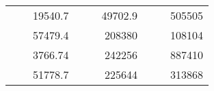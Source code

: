 \begin{table}[H]
\begin{tabular}{|ccrccrccc}
\rowcolor[HTML]{DDFDFF} 
\multicolumn{1}{|c|}{\cellcolor[HTML]{FFFFC7}}                                & \multicolumn{1}{c|}{\cellcolor[HTML]{DDFDFF}}                      & \multicolumn{1}{r|}{\cellcolor[HTML]{DAE8FC}19540.7}   & \multicolumn{1}{c|}{\cellcolor[HTML]{FFFFC7}}                                & \multicolumn{1}{c|}{\cellcolor[HTML]{DDFDFF}}                       & \multicolumn{1}{r|}{\cellcolor[HTML]{DDFDFF}49702.9}   & \multicolumn{1}{c|}{\cellcolor[HTML]{FFFFC7}}                                & \multicolumn{1}{c|}{\cellcolor[HTML]{DDFDFF}}                      & \multicolumn{1}{r|}{\cellcolor[HTML]{DDFDFF}505505}    \\ \cline{3-3} \cline{6-6} \cline{9-9} 
\multicolumn{1}{|c|}{\cellcolor[HTML]{FFFFC7}}                                & \multicolumn{1}{c|}{\cellcolor[HTML]{DDFDFF}}                      & \multicolumn{1}{r|}{\cellcolor[HTML]{DDFDFF}57479.4}   & \multicolumn{1}{c|}{\cellcolor[HTML]{FFFFC7}}                                & \multicolumn{1}{c|}{\cellcolor[HTML]{DDFDFF}}                       & \multicolumn{1}{r|}{\cellcolor[HTML]{DAE8FC}208380}    & \multicolumn{1}{c|}{\cellcolor[HTML]{FFFFC7}}                                & \multicolumn{1}{c|}{\cellcolor[HTML]{DDFDFF}}                      & \multicolumn{1}{r|}{\cellcolor[HTML]{DAE8FC}108104}    \\ \cline{3-3} \cline{6-6} \cline{9-9} 
\rowcolor[HTML]{DDFDFF} 
\multicolumn{1}{|c|}{\cellcolor[HTML]{FFFFC7}}                                & \multicolumn{1}{c|}{\cellcolor[HTML]{DDFDFF}}                      & \multicolumn{1}{r|}{\cellcolor[HTML]{DAE8FC}3766.74}   & \multicolumn{1}{c|}{\cellcolor[HTML]{FFFFC7}}                                & \multicolumn{1}{c|}{\cellcolor[HTML]{DDFDFF}}                       & \multicolumn{1}{r|}{\cellcolor[HTML]{DDFDFF}242256}    & \multicolumn{1}{c|}{\cellcolor[HTML]{FFFFC7}}                                & \multicolumn{1}{c|}{\cellcolor[HTML]{DDFDFF}}                      & \multicolumn{1}{r|}{\cellcolor[HTML]{DDFDFF}887410}    \\ \cline{3-3} \cline{6-6} \cline{9-9} 
\multicolumn{1}{|c|}{\cellcolor[HTML]{FFFFC7}}                                & \multicolumn{1}{c|}{\cellcolor[HTML]{DDFDFF}}                      & \multicolumn{1}{r|}{\cellcolor[HTML]{DDFDFF}51778.7}   & \multicolumn{1}{c|}{\cellcolor[HTML]{FFFFC7}}                                & \multicolumn{1}{c|}{\cellcolor[HTML]{DDFDFF}}                       & \multicolumn{1}{r|}{\cellcolor[HTML]{DAE8FC}225644}    & \multicolumn{1}{c|}{\cellcolor[HTML]{FFFFC7}}                                & \multicolumn{1}{c|}{\cellcolor[HTML]{DDFDFF}}                      & \multicolumn{1}{r|}{\cellcolor[HTML]{DAE8FC}313868}    \\ \cline{3-3} \cline{6-6} \cline{9-9} 

\end{tabular}
\end{table}

